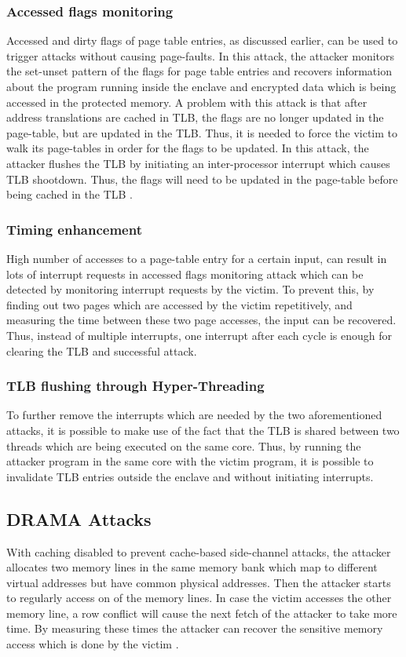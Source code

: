 \subsubsection{Accessed flags monitoring}
Accessed and dirty flags of page table entries, as discussed earlier, can be used to trigger attacks without causing page-faults. In this attack, the attacker monitors the set-unset pattern of the flags for page table entries and recovers information about the program running inside the enclave and encrypted data which is being accessed in the protected memory. A problem with this attack is that after address translations are cached in TLB, the flags are no longer updated in the page-table, but are updated in the TLB. Thus, it is needed to force the victim to walk its page-tables in order for the flags to be updated. In this attack, the attacker flushes the TLB by initiating an inter-processor interrupt which causes TLB shootdown. Thus, the flags will need to be updated in the page-table before being cached in the TLB \cite{leakycauldron,stealthy}.
\subsubsection{Timing enhancement}
High number of accesses to a page-table entry for a certain input, can result in lots of interrupt requests in accessed flags monitoring attack which can be detected by monitoring interrupt requests by the victim. To prevent this, by finding out two pages which are accessed by the victim repetitively, and measuring the time between these two page accesses, the input can be recovered. Thus, instead of multiple interrupts, one interrupt after each cycle is enough for clearing the TLB and successful attack.
\subsubsection{TLB flushing through Hyper-Threading}
To further remove the interrupts which are needed by the two aforementioned attacks, it is possible to make use of the fact that the TLB is shared between two threads which are being executed on the same core. Thus, by running the attacker program in the same core with the victim program, it is possible to invalidate TLB entries outside the enclave and without initiating interrupts.

\subsection{DRAMA Attacks}
With caching disabled to prevent cache-based side-channel attacks, the attacker allocates two memory lines in the same memory bank which map to different virtual addresses but have common physical addresses. Then the attacker starts to regularly access on of the memory lines. In case the victim accesses the other memory line, a row conflict will cause the next fetch of the attacker to take more time. By measuring these times the attacker can recover the sensitive memory access which is done by the victim \cite{leakycauldron,drama}.

